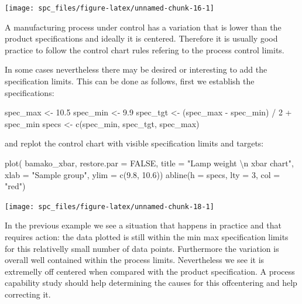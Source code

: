\documentclass[
]{book}
\newenvironment{Shaded}{\begin{snugshade}}{\end{snugshade}}
\newcommand{\AttributeTok}[1]{\textcolor[rgb]{0.77,0.63,0.00}{#1}}
\newcommand{\ConstantTok}[1]{\textcolor[rgb]{0.00,0.00,0.00}{#1}}
\newcommand{\DecValTok}[1]{\textcolor[rgb]{0.00,0.00,0.81}{#1}}
\newcommand{\FloatTok}[1]{\textcolor[rgb]{0.00,0.00,0.81}{#1}}
\newcommand{\FunctionTok}[1]{\textcolor[rgb]{0.00,0.00,0.00}{#1}}
\newcommand{\NormalTok}[1]{#1}
\newcommand{\OtherTok}[1]{\textcolor[rgb]{0.56,0.35,0.01}{#1}}
\newcommand{\SpecialCharTok}[1]{\textcolor[rgb]{0.00,0.00,0.00}{#1}}
\newcommand{\StringTok}[1]{\textcolor[rgb]{0.31,0.60,0.02}{#1}}
\begin{document}
\texttt{[image: spc\_files/figure-latex/unnamed-chunk-16-1]}

A manufacturing process under control has a variation that is lower than the product specifications and ideally it is centered. Therefore it is usually good practice to follow the control chart rules refering to the process control limits.

In some cases nevertheless there may be desired or interesting to add the specification limits. This can be done as follows, first we establish the specifications:

\begin{Shaded}
\begin{Highlighting}[]
\NormalTok{spec\_max }\OtherTok{\textless{}{-}} \FloatTok{10.5}
\NormalTok{spec\_min }\OtherTok{\textless{}{-}} \FloatTok{9.9}
\NormalTok{spec\_tgt }\OtherTok{\textless{}{-}}\NormalTok{ (spec\_max }\SpecialCharTok{{-}}\NormalTok{ spec\_min) }\SpecialCharTok{/} \DecValTok{2} \SpecialCharTok{+}\NormalTok{ spec\_min}
\NormalTok{specs }\OtherTok{\textless{}{-}} \FunctionTok{c}\NormalTok{(spec\_min, spec\_tgt, spec\_max)}
\end{Highlighting}
\end{Shaded}

and replot the control chart with visible specification limits and targets:

\begin{Shaded}
\begin{Highlighting}[]
\FunctionTok{plot}\NormalTok{(}
\NormalTok{  bamako\_xbar,}
  \AttributeTok{restore.par =} \ConstantTok{FALSE}\NormalTok{,}
  \AttributeTok{title =} \StringTok{"Lamp weight }\SpecialCharTok{\textbackslash{}n}\StringTok{ xbar chart"}\NormalTok{,}
  \AttributeTok{xlab =} \StringTok{"Sample group"}\NormalTok{,}
  \AttributeTok{ylim =} \FunctionTok{c}\NormalTok{(}\FloatTok{9.8}\NormalTok{, }\FloatTok{10.6}\NormalTok{))}
\FunctionTok{abline}\NormalTok{(}\AttributeTok{h =}\NormalTok{ specs, }\AttributeTok{lty =} \DecValTok{3}\NormalTok{, }\AttributeTok{col =} \StringTok{"red"}\NormalTok{)}
\end{Highlighting}
\end{Shaded}

\texttt{[image: spc\_files/figure-latex/unnamed-chunk-18-1]}

In the previous example we see a situation that happens in practice and that requires action: the data plotted is still within the min max specification limits for this relativelly small number of data points. Furthermore the variation is overall well contained within the process limits. Nevertheless we see it is extremelly off centered when compared with the product specification. A process capability study should help determining the causes for this offcentering and help correcting it.
\end{document}
